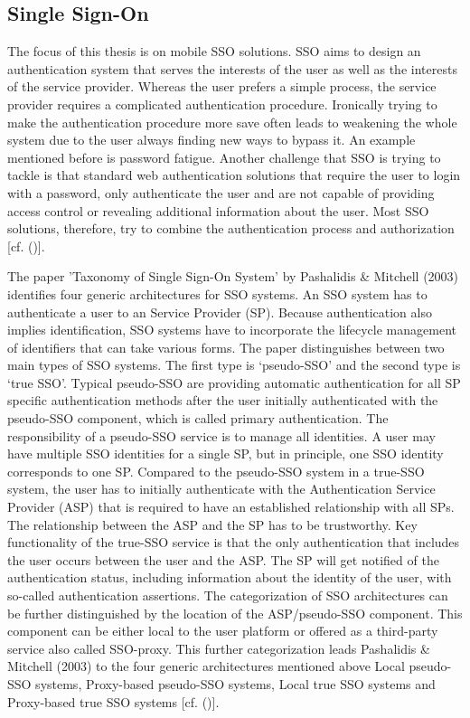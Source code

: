 {{		\subsection{Single Sign-On}	The focus of this thesis is on mobile SSO solutions. SSO aims to design an authentication system that serves the interests of the user as well as the interests of the service provider. Whereas the user prefers a simple process, the service provider requires a complicated authentication procedure. Ironically trying to make the authentication procedure more save often leads to weakening the whole system due to the user always finding new ways to bypass it. An example mentioned before is password fatigue. Another challenge that SSO is trying to tackle is that standard web authentication solutions that require the user to login with a password, only authenticate the user and are not capable of providing access control or revealing additional information about the user. Most SSO solutions, therefore, try to combine the authentication process and authorization [cf. (\cite{Prochazka:2010:UCA})].
		
		The paper 'Taxonomy of Single Sign-On System' by Pashalidis \& Mitchell (2003) identifies four generic architectures for SSO systems. An SSO system has to authenticate a user to an Service Provider (SP). Because authentication also implies identification, SSO systems have to incorporate the lifecycle management of identifiers that can take various forms. The paper distinguishes between two main types of SSO systems. The first type is ‘pseudo-SSO’ and the second type is ‘true SSO’. Typical pseudo-SSO are providing automatic authentication for all SP specific authentication methods after the user initially authenticated with the pseudo-SSO component, which is called primary authentication. The responsibility of a pseudo-SSO service is to manage all identities. A user may have multiple SSO identities for a single SP, but in principle, one SSO identity corresponds to one SP. Compared to the pseudo-SSO system in a true-SSO system, the user has to initially authenticate with the Authentication Service Provider (ASP) that is required to have an established relationship with all SPs. The relationship between the ASP and the SP has to be trustworthy. Key functionality of the true-SSO service is that the only authentication that includes the user occurs between the user and the ASP. The SP will get notified of the authentication status, including information about the identity of the user, with so-called authentication assertions. The categorization of SSO architectures can be further distinguished by the location of the ASP/pseudo-SSO component. This component can be either local to the user platform or offered as a third-party service also called SSO-proxy. This further categorization leads Pashalidis \& Mitchell (2003) to the four generic architectures mentioned above Local pseudo-SSO systems, Proxy-based pseudo-SSO systems, Local true SSO systems and Proxy-based true SSO systems  [cf. (\cite{Pashalidis:2003:10.1007/3-540-45067-X_22})].
		
}}

